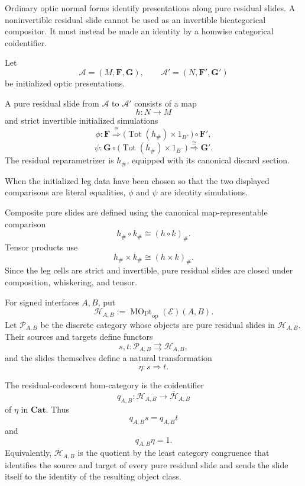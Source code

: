Ordinary optic normal forms identify presentations along pure residual slides. A noninvertible
residual slide cannot be used as an invertible bicategorical compositor. It must instead be made an
identity by a homwise categorical coidentifier.

\begin{definition}
\label{def:pure-residual-slide}
Let
\[
  \mathcal A=(M,\mathbf F,\mathbf G),
  \qquad
  \mathcal A'=(N,\mathbf F',\mathbf G')
\]
be initialized optic presentations.

A pure residual slide from \(\mathcal A\) to \(\mathcal A'\) consists of a map
\[
  h:N\to M
\]
and strict invertible initialized simulations
\[
  \phi:
  \mathbf F
  \overset{\cong}{\Longrightarrow}
  \bigl(
    \operatorname{Tot}(h_\#)\times1_{B^+}
  \bigr)
  \circ\mathbf F',
\]
\[
  \psi:
  \mathbf G\circ
  \bigl(
    \operatorname{Tot}(h_\#)\times1_{B^-}
  \bigr)
  \overset{\cong}{\Longrightarrow}
  \mathbf G'.
\]
The residual reparametrizer is \(h_\#\), equipped with its canonical discard section.

When the initialized leg data have been chosen so that the two displayed comparisons are literal
equalities, \(\phi\) and \(\psi\) are identity simulations.
\end{definition}

Composite pure slides are defined using the canonical map-representable comparison
\[
  h_\#\circ k_\#
  \cong
  (h\circ k)_\#.
\]
Tensor products use
\[
  h_\#\times k_\#
  \cong
  (h\times k)_\#.
\]
Since the leg cells are strict and invertible, pure residual slides are closed under composition,
whiskering, and tensor.

For signed interfaces \(A,B\), put
\[
  \mathcal H_{A,B}
  :=
  \operatorname{MOpt}_{\mathrm{op}}(\mathcal E)(A,B).
\]
Let \(\mathcal P_{A,B}\) be the discrete category whose objects are pure residual slides in
\(\mathcal H_{A,B}\). Their sources and targets define functors
\[
  s,t:
  \mathcal P_{A,B}
  \rightrightarrows
  \mathcal H_{A,B},
\]
and the slides themselves define a natural transformation
\[
  \eta:s\Longrightarrow t.
\]

\begin{definition}
\label{def:residual-coidentifier}
The residual-codescent hom-category is the coidentifier
\[
  q_{A,B}:
  \mathcal H_{A,B}
  \longrightarrow
  \overline{\mathcal H}_{A,B}
\]
of \(\eta\) in \(\mathbf{Cat}\). Thus
\[
  q_{A,B}s=q_{A,B}t
\]
and
\[
  q_{A,B}\eta=1.
\]
Equivalently, \(\overline{\mathcal H}_{A,B}\) is the quotient by the least category congruence that
identifies the source and target of every pure residual slide and sends the slide itself to the
identity of the resulting object class.
\end{definition}

